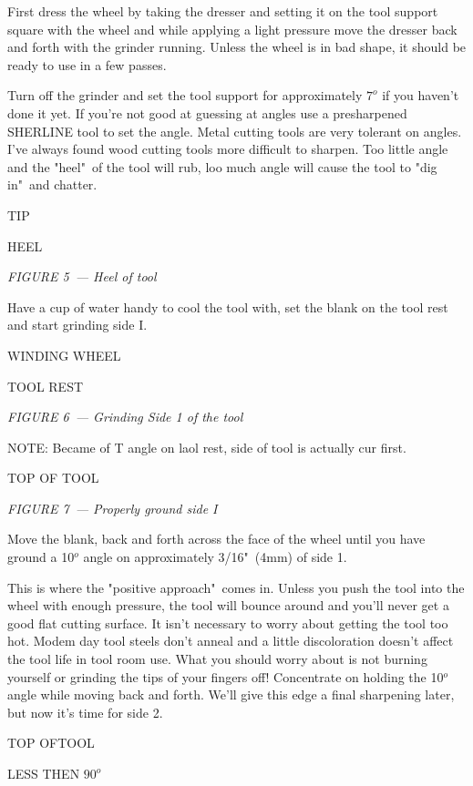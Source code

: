 First dress the wheel by taking the dresser and setting it on the tool support
square with the wheel and while applying a light pressure move the dresser back
and forth with the grinder running. Unless the wheel is in bad shape, it should
be ready to use in a few passes.


Turn off the grinder and set the tool support for approximately $7^{o}$ if you
haven't done it yet. If you're not good at guessing at angles use a presharpened
SHERLINE tool to set the angle. Metal cutting tools are very tolerant on angles.
I've always found wood cutting tools more difficult to sharpen. Too little angle
and the "heel"\ of the tool will rub, loo much angle will cause the tool to "dig
in"\ and chatter.

\bigskip
TIP

HEEL
\bigskip

\textit{FIGURE 5\ --- Heel of tool}

Have a cup of water handy to cool the tool with, set the blank on the tool rest
and start grinding side I.

\bigskip
WINDING WHEEL

TOOL REST
\bigskip

\textit{FIGURE 6\ --- Grinding Side 1 of the tool}

\bigskip
NOTE: Became of T angle on laol rest, side of tool is actually cur first.

TOP OF TOOL
\bigskip

\textit{FIGURE 7\ --- Properly ground side I}
\bigskip

Move the blank, back and forth across the face of the wheel until you have
ground a 10$^{o}$ angle on approximately 3/16"\ (4mm) of side 1.

This is where the "positive approach"\ comes in. Unless you push the tool into
the wheel with enough pressure, the tool will bounce around and you'll never get
a good flat cutting surface. It isn't necessary to worry about getting the tool
too hot. Modem day tool steels don't anneal and a little discoloration doesn't
affect the tool life in tool room use. What you should worry about is not
burning yourself or grinding the tips of your fingers off! Concentrate on
holding the 10$^{o}$ angle while moving back and forth. We'll give this edge a
final sharpening later, but now it's time for side 2.

\bigskip
TOP OFTOOL

LESS THEN $90^o$
\bigskip

